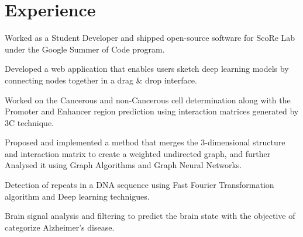 \documentclass[]{durgesh_resume}
\begin{document}
\hfill
\begin{minipage}[t]{0.66\textwidth} 


\section{Experience}
\vspace{\topsep} %
\begin{tightemize}
\item Worked as a Student Developer and shipped open-source software for ScoRe Lab under the Google Summer of Code program.
\item Developed a web application that enables users sketch deep learning models by connecting nodes together in a drag \& drop interface.
\end{tightemize}
\sectionsep


\begin{tightemize}
\item Worked on the Cancerous and non-Cancerous cell determination along with the Promoter and Enhancer region prediction using interaction matrices generated by 3C technique.
\item Proposed and implemented a method that merges the 3-dimensional structure and interaction matrix to create a weighted undirected graph, and further Analysed it using Graph Algorithms and Graph Neural Networks.
\end{tightemize}
\sectionsep


\begin{tightemize}
\item Detection of repeats in a DNA sequence using Fast Fourier Transformation algorithm and Deep learning technigues.
\item Brain signal analysis and filtering to predict the brain state with the objective of categorize Alzheimer's disease.
\end{tightemize}
\sectionsep


\end{minipage}
\end{document}
